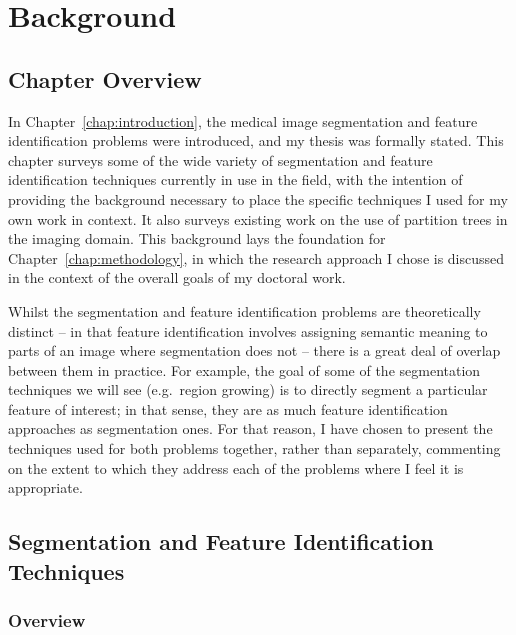 \chapter{Background}
\label{chap:background}

\section{Chapter Overview}

In Chapter~\ref{chap:introduction}, the medical image segmentation and feature identification problems were introduced, and my thesis was formally stated. This chapter surveys some of the wide variety of segmentation and feature identification techniques currently in use in the field, with the intention of providing the background necessary to place the specific techniques I used for my own work in context. It also surveys existing work on the use of partition trees in the imaging domain. This background lays the foundation for Chapter~\ref{chap:methodology}, in which the research approach I chose is discussed in the context of the overall goals of my doctoral work.

Whilst the segmentation and feature identification problems are theoretically distinct -- in that feature identification involves assigning semantic meaning to parts of an image where segmentation does not -- there is a great deal of overlap between them in practice. For example, the goal of some of the segmentation techniques we will see (e.g.~region growing) is to directly segment a particular feature of interest; in that sense, they are as much feature identification approaches as segmentation ones. For that reason, I have chosen to present the techniques used for both problems together, rather than separately, commenting on the extent to which they address each of the problems where I feel it is appropriate.

\section{Segmentation and Feature Identification Techniques}

\subsection{Overview}

